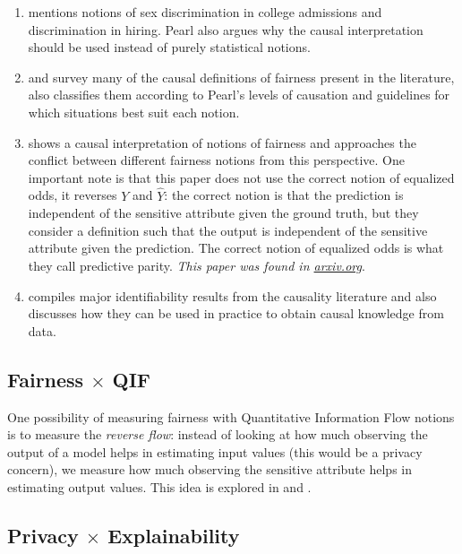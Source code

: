 \begin{enumerate}
\item \cite{Causality} mentions notions of sex discrimination in college admissions and discrimination in hiring. Pearl also argues why the causal interpretation should be used instead of purely statistical notions.
\item \cite{makhlouf2024causality} and \cite{su2022review} survey many of the causal definitions of fairness present in the literature, \cite{makhlouf2024causality} also classifies them according to Pearl's levels of causation and guidelines for which situations best suit each notion.
\item \cite{saravanakumar2020impossibility} shows a causal interpretation of notions of fairness and approaches the conflict between different fairness notions from this perspective. One important note is that this paper does not use the correct notion of equalized odds, it reverses $Y$ and $\hat{Y}$: the correct notion is that the prediction is independent of the sensitive attribute given the ground truth, but they consider a definition such that the output is independent of the sensitive attribute given the prediction. The correct notion of equalized odds is what they call predictive parity. \emph{This paper was found in \url{arxiv.org}}.
\item \cite{makhlouf2022identifiability} compiles major identifiability results from the causality literature and also discusses how they can be used in practice to obtain causal knowledge from data.
\end{enumerate}

\subsection{Fairness $\times$ QIF}

One possibility of measuring fairness with Quantitative Information Flow notions is to measure the \emph{reverse flow}: instead of looking at how much observing the output of a model helps in estimating input values (this would be a privacy concern), we measure how much observing the sensitive attribute helps in estimating output values. This idea is explored in \cite{Bruno} and \cite{nogueira2023relation}.

\subsection{Privacy $\times$ Explainability}

